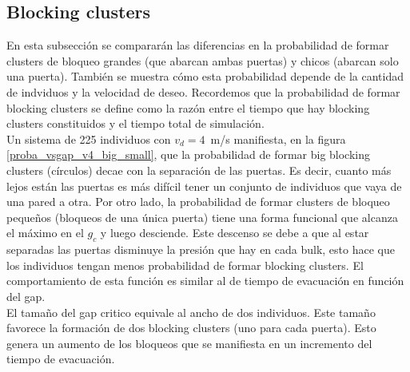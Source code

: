 \subsection{Blocking clusters}

En esta subsección se compararán las diferencias en la probabilidad de formar clusters de bloqueo grandes (que abarcan ambas puertas) y chicos (abarcan solo una puerta). También se muestra cómo esta probabilidad depende de la cantidad de indviduos y la velocidad de deseo. Recordemos que la probabilidad de formar blocking clusters se define como la razón entre el tiempo que hay blocking clusters constituidos y el tiempo total de simulación. \\

Un sistema de 225 individuos con $v_d=4$~m/s manifiesta, en la figura \ref{proba_vsgap_v4_big_small}, que la probabilidad de formar big blocking clusters (círculos) decae con la separación de las puertas. Es decir, cuanto más lejos están las puertas es más difícil tener un conjunto de individuos que vaya de una pared a otra.
Por otro lado, la probabilidad de formar clusters de bloqueo pequeños (bloqueos de una única puerta) tiene una forma funcional que alcanza el máximo en el $g_c$ y luego desciende. Este descenso se debe a que al estar separadas las puertas disminuye la presión que hay en cada bulk, esto hace que los individuos tengan menos probabilidad de formar blocking clusters. El comportamiento de esta función es similar al de tiempo de evacuación en función del gap.\\

El tamaño del gap critico equivale al ancho de dos individuos. Este tamaño favorece la formación de dos blocking clusters (uno para cada puerta). Esto genera un aumento de los bloqueos que se manifiesta en un incremento del tiempo de evacuación. 


